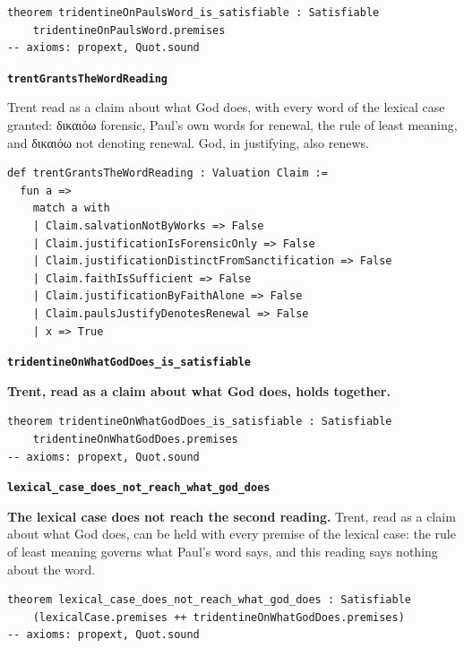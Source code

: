 \documentclass[11pt]{article}
\begin{document}
{\small\begin{verbatim}
theorem tridentineOnPaulsWord_is_satisfiable : Satisfiable
    tridentineOnPaulsWord.premises
-- axioms: propext, Quot.sound
\end{verbatim}}
\par\medskip\noindent\textbf{\texttt{trent\allowbreak{}Grants\allowbreak{}The\allowbreak{}Word\allowbreak{}Reading}}\par\nobreak\noindent
Trent read as a claim about what God does, with every word of the lexical case granted: δικαιόω forensic, Paul's own words for renewal, the rule of least meaning, and δικαιόω not denoting renewal. God, in justifying, also renews.

{\small\begin{verbatim}
def trentGrantsTheWordReading : Valuation Claim :=
  fun a =>
    match a with
    | Claim.salvationNotByWorks => False
    | Claim.justificationIsForensicOnly => False
    | Claim.justificationDistinctFromSanctification => False
    | Claim.faithIsSufficient => False
    | Claim.justificationByFaithAlone => False
    | Claim.paulsJustifyDenotesRenewal => False
    | x => True
\end{verbatim}}
\par\medskip\noindent\textbf{\texttt{tridentine\allowbreak{}On\allowbreak{}What\allowbreak{}God\allowbreak{}Does\_\allowbreak{}is\_\allowbreak{}satisfiable}}\par\nobreak\noindent
\textbf{Trent, read as a claim about what God does, holds together.}

{\small\begin{verbatim}
theorem tridentineOnWhatGodDoes_is_satisfiable : Satisfiable
    tridentineOnWhatGodDoes.premises
-- axioms: propext, Quot.sound
\end{verbatim}}
\par\medskip\noindent\textbf{\texttt{lexical\_\allowbreak{}case\_\allowbreak{}does\_\allowbreak{}not\_\allowbreak{}reach\_\allowbreak{}what\_\allowbreak{}god\_\allowbreak{}does}}\par\nobreak\noindent
\textbf{The lexical case does not reach the second reading.} Trent, read as a claim about what God does, can be held with every premise of the lexical case: the rule of least meaning governs what Paul's word says, and this reading says nothing about the word.

{\small\begin{verbatim}
theorem lexical_case_does_not_reach_what_god_does : Satisfiable
    (lexicalCase.premises ++ tridentineOnWhatGodDoes.premises)
-- axioms: propext, Quot.sound
\end{verbatim}}
\end{document}
